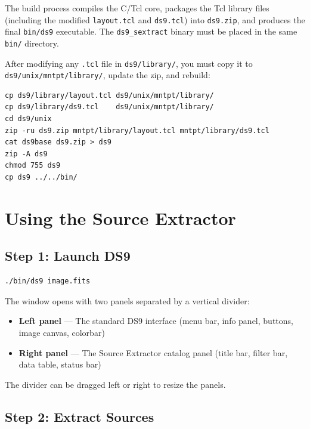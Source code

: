 \documentclass[11pt,fleqn]{book}
\newcommand{\sextract}{\texttt{ds9\_sextract}}
\begin{document}
The build process compiles the C/Tcl core, packages the Tcl library files (including the modified \texttt{layout.tcl} and \texttt{ds9.tcl}) into \texttt{ds9.zip}, and produces the final \texttt{bin/ds9} executable. The \sextract{} binary must be placed in the same \texttt{bin/} directory.

\begin{important}
After modifying any \texttt{.tcl} file in \texttt{ds9/library/}, you must copy it to \texttt{ds9/unix/mntpt/library/}, update the zip, and rebuild:
\begin{codebox}
\begin{lstlisting}[style=bash,numbers=none]
cp ds9/library/layout.tcl ds9/unix/mntpt/library/
cp ds9/library/ds9.tcl    ds9/unix/mntpt/library/
cd ds9/unix
zip -ru ds9.zip mntpt/library/layout.tcl mntpt/library/ds9.tcl
cat ds9base ds9.zip > ds9
zip -A ds9
chmod 755 ds9
cp ds9 ../../bin/
\end{lstlisting}
\end{codebox}
\end{important}

\section{Using the Source Extractor}

\subsection{Step 1: Launch DS9}

\begin{codebox}[Launch]
\begin{lstlisting}[style=bash,numbers=none]
./bin/ds9 image.fits
\end{lstlisting}
\end{codebox}

The window opens with two panels separated by a vertical divider:
\begin{itemize}[leftmargin=2em]
  \item \textbf{Left panel} --- The standard DS9 interface (menu bar, info panel, buttons, image canvas, colorbar)
  \item \textbf{Right panel} --- The Source Extractor catalog panel (title bar, filter bar, data table, status bar)
\end{itemize}

The divider can be dragged left or right to resize the panels.

\subsection{Step 2: Extract Sources}
\end{document}
